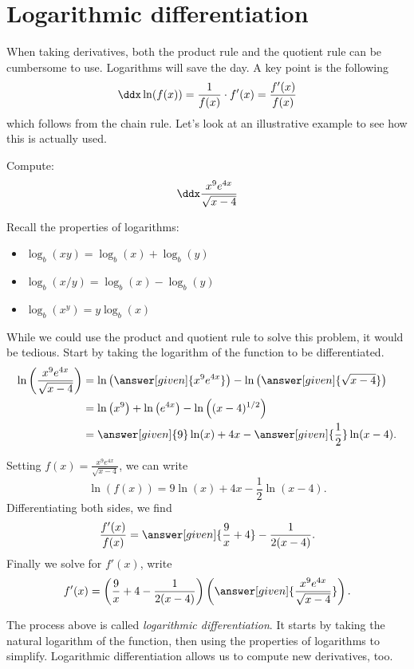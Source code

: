 \documentclass{ximera}
\begin{document}
\section{Logarithmic differentiation}


When taking derivatives, both the product rule and the quotient rule can be cumbersome to use. Logarithms will save the day. A key point is the following
\[ \ddx \ln(f(x)) = \frac{1}{f(x)}\cdot f'(x) = \frac{f'(x)}{f(x)} \]
which follows from the chain rule. Let's look at an illustrative example to see how this is actually used.

\begin{example} 
	Compute:
	\[
	\ddx \frac{x^9e^{4x}}{\sqrt{x-4}}
	\]
	\begin{explanation}
		Recall the properties of logarithms:
		\begin{itemize}
			\item $\log_b(xy) = \log_b(x) + \log_b(y)$
			\item $\log_b(x/y) = \log_b(x) - \log_b(y)$
			\item $\log_b(x^y) = y\log_b(x)$
		\end{itemize}
		
		While we could use the product and quotient rule to solve this problem, it would be tedious. Start by taking the logarithm of the function to be differentiated.
		\begin{align*}
			\ln\left(\frac{x^9e^{4x}}{\sqrt{x-4}} \right) &= \ln\left(\answer[given]{x^9e^{4x}}\right) - \ln\left(\answer[given]{\sqrt{x-4}}\right)\\
				&= \ln\left(x^9\right)+\ln\left(e^{4x}\right) - \ln\left((x-4)^{1/2}\right)\\
				&= \answer[given]{9}\ln(x)+4x - \answer[given]{\frac{1}{2}}\ln(x-4).
		\end{align*}

		Setting $f(x) = \frac{x^9e^{4x}}{\sqrt{x-4}}$, we can write
		\[ \ln(f(x)) = 9\ln(x)+4x - \frac{1}{2}\ln(x-4).\]
		Differentiating both sides, we find
		\[ \frac{f'(x)}{f(x)} = \answer[given]{\frac{9}{x}+4} - \frac{1}{2(x-4)}.\]
		Finally we solve for $f'(x)$, write
		\[f'(x) = \left(\frac{9}{x}+4 - \frac{1}{2(x-4)}\right)\left(\answer[given]{\frac{x^9e^{4x}}{\sqrt{x-4}}}\right). \]
	\end{explanation}
\end{example}

The process above is called \textit{logarithmic differentiation}. It starts by taking the natural logarithm of the function, then using the properties of logarithms to simplify.
Logarithmic differentiation allows us to compute new derivatives, too.
\end{document}
